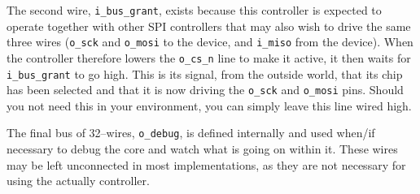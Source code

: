 \documentclass{gqtekspec}
\begin{document}
The second wire, {\tt i\_bus\_grant}, exists because this controller is 
expected to operate together with other SPI controllers that may also wish
to drive the same three wires ({\tt o\_sck} and {\tt o\_mosi} to the device,
and {\tt i\_miso} from the device).  When the controller therefore lowers the
{\tt o\_cs\_n} line to make it active, it then waits for {\tt i\_bus\_grant}
to go high.  This is its signal, from the outside world, that its chip has been
selected and that it is now driving the {\tt o\_sck} and {\tt o\_mosi} pins.
Should you not need this in your environment, you can simply leave this line
wired high.

The final bus of 32--wires, {\tt o\_debug}, is defined internally and used
when/if necessary to debug the core and watch what is going on within it.
These wires may be left unconnected in most implementations, as they are not
necessary for using the actually controller.

\end{document}
